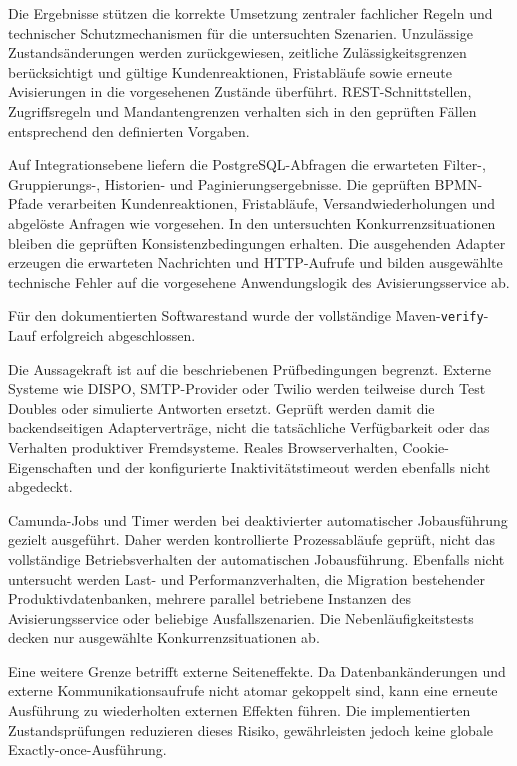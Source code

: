 Die Ergebnisse stützen die korrekte Umsetzung zentraler fachlicher Regeln und
technischer Schutzmechanismen für die untersuchten Szenarien. Unzulässige
Zustandsänderungen werden zurückgewiesen, zeitliche Zulässigkeitsgrenzen
berücksichtigt und gültige Kundenreaktionen, Fristabläufe sowie erneute
Avisierungen in die vorgesehenen Zustände überführt. REST-Schnittstellen,
Zugriffsregeln und Mandantengrenzen verhalten sich in den geprüften Fällen
entsprechend den definierten Vorgaben.

Auf Integrationsebene liefern die PostgreSQL-Abfragen die erwarteten Filter-,
Gruppierungs-, Historien- und Paginierungsergebnisse. Die geprüften BPMN-Pfade
verarbeiten Kundenreaktionen, Fristabläufe, Versandwiederholungen und abgelöste
Anfragen wie vorgesehen. In den untersuchten Konkurrenzsituationen bleiben die
geprüften Konsistenzbedingungen erhalten. Die ausgehenden Adapter erzeugen die
erwarteten Nachrichten und HTTP-Aufrufe und bilden ausgewählte technische Fehler
auf die vorgesehene Anwendungslogik des Avisierungsservice ab.

Für den dokumentierten Softwarestand wurde der vollständige
Maven-\texttt{verify}-Lauf erfolgreich abgeschlossen.

Die Aussagekraft ist auf die beschriebenen Prüfbedingungen begrenzt. Externe
Systeme wie DISPO, SMTP-Provider oder Twilio werden teilweise durch Test Doubles
oder simulierte Antworten ersetzt. Geprüft werden damit die backendseitigen
Adapterverträge, nicht die tatsächliche Verfügbarkeit oder das Verhalten
produktiver Fremdsysteme. Reales Browserverhalten, Cookie-Eigenschaften und der
konfigurierte Inaktivitätstimeout werden ebenfalls nicht abgedeckt.

Camunda-Jobs und Timer werden bei deaktivierter automatischer Jobausführung
gezielt ausgeführt. Daher werden kontrollierte Prozessabläufe geprüft, nicht das
vollständige Betriebsverhalten der automatischen Jobausführung. Ebenfalls nicht
untersucht werden Last- und Performanzverhalten, die Migration bestehender
Produktivdatenbanken, mehrere parallel betriebene Instanzen des
Avisierungsservice oder beliebige Ausfallszenarien. Die Nebenläufigkeitstests
decken nur ausgewählte Konkurrenzsituationen ab.

Eine weitere Grenze betrifft externe Seiteneffekte. Da Datenbankänderungen und
externe Kommunikationsaufrufe nicht atomar gekoppelt sind, kann eine erneute
Ausführung zu wiederholten externen Effekten führen. Die implementierten
Zustandsprüfungen reduzieren dieses Risiko, gewährleisten jedoch keine globale
Exactly-once-Ausführung.


